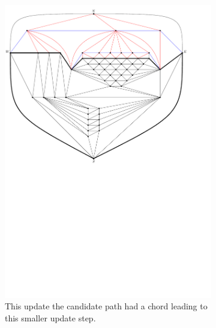 \begin{figure}
    \ContinuedFloat
    \begin{subfigure}[b]{.9 \textwidth}
      \includegraphics[width=\textwidth]{examples/img/vertWorstCase/sweep3}
      \caption{This update the candidate path had a chord leading to this smaller update step.}
      \label{fig:ex:vert:sweep3}
    \end{subfigure}
    ~
    \begin{subfigure}[b]{.9 \textwidth}

\end{subfigure}
\end{figure}
